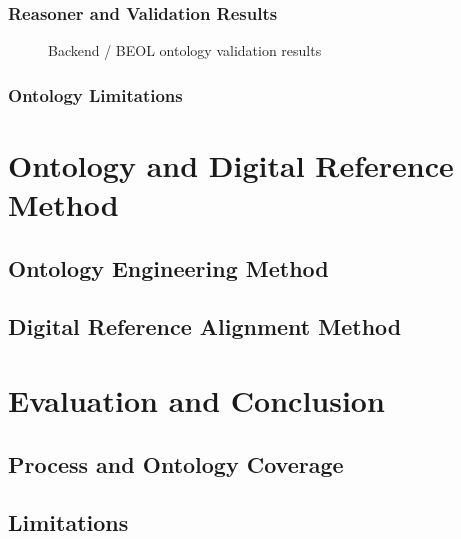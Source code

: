 \documentclass[11pt,a4paper]{report}
\begin{document}
\subsection{Reasoner and Validation Results}
\begin{figure}[htbp]
  \centering
  \caption{Backend / BEOL ontology validation results}
  \label{fig:beol-validation}
\end{figure}

\subsection{Ontology Limitations}


\chapter{Ontology and Digital Reference Method}
\section{Ontology Engineering Method}
\section{Digital Reference Alignment Method}

\chapter{Evaluation and Conclusion}
\section{Process and Ontology Coverage}
\section{Limitations}

\printbibliography[heading=bibintoc,title={References}]
\end{document}

